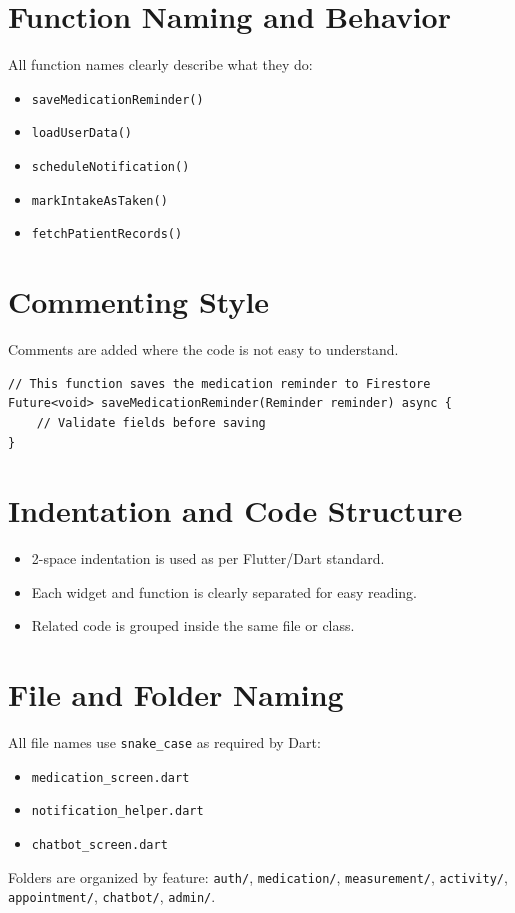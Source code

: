 \section{Function Naming and Behavior}
All function names clearly describe what they do:
\begin{itemize}
    \item \texttt{saveMedicationReminder()}
    \item \texttt{loadUserData()}
    \item \texttt{scheduleNotification()}
    \item \texttt{markIntakeAsTaken()}
    \item \texttt{fetchPatientRecords()}
\end{itemize}

\section{Commenting Style}
Comments are added where the code is not easy to understand.
\begin{lstlisting}
// This function saves the medication reminder to Firestore
Future<void> saveMedicationReminder(Reminder reminder) async {
    // Validate fields before saving
}
\end{lstlisting}

\section{Indentation and Code Structure}
\begin{itemize}
    \item 2-space indentation is used as per Flutter/Dart standard.
    \item Each widget and function is clearly separated for easy reading.
    \item Related code is grouped inside the same file or class.
\end{itemize}

\section{File and Folder Naming}
All file names use \texttt{snake\_case} as required by Dart:
\begin{itemize}
    \item \texttt{medication\_screen.dart}
    \item \texttt{notification\_helper.dart}
    \item \texttt{chatbot\_screen.dart}
\end{itemize}
Folders are organized by feature: \texttt{auth/}, \texttt{medication/}, \texttt{measurement/}, \texttt{activity/}, \texttt{appointment/}, \texttt{chatbot/}, \texttt{admin/}.


